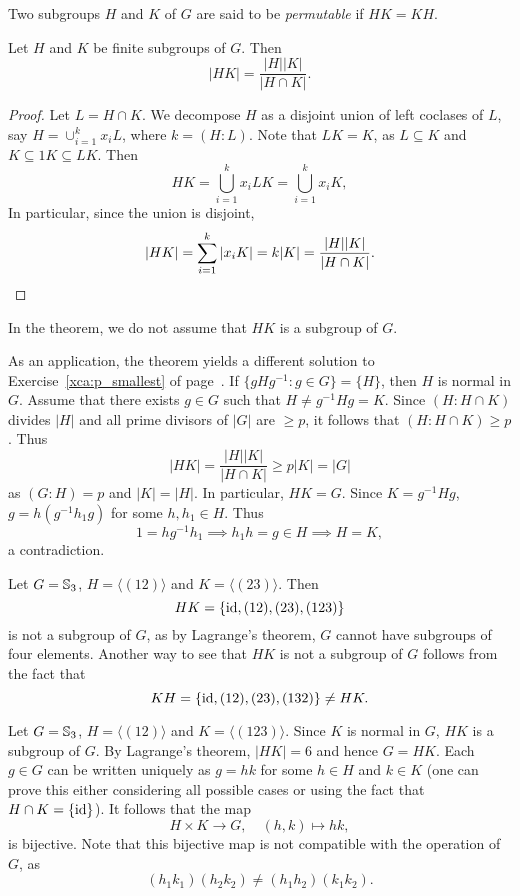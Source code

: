 Two subgroups $H$ and $K$ of $G$ are said to be
\emph{permutable} if $HK=KH$.

\begin{theorem}
\label{thm:|HK|}
    Let $H$ and $K$ be finite subgroups of $G$. 
    Then 
    \[
        |HK|=\frac{|H||K|}{|H\cap K|}.
    \]
\end{theorem}

\begin{proof}
Let $L=H\cap K$.
We decompose $H$ as a disjoint union of left coclases of $L$, say 
$H=\cup_{i=1}^k x_iL$, where $k=(H:L)$. Note that $LK=K$, as $L\subseteq K$ and $K\subseteq 1K\subseteq LK$.
Then
\[
HK=\bigcup_{i=1}^k x_iLK=\bigcup_{i=1}^k x_iK,
\]
In particular, since the union is disjoint, 
\[
|HK|=\sum_{i=1}^k |x_iK|=k|K|=\frac{|H||K|}{|H\cap K|}.\qedhere
\]
\end{proof}

In the theorem, we do not assume that $HK$ is a subgroup of $G$. 

As an application, the theorem yields a different solution to Exercise~\ref{xca:p_smallest} of page~\pageref{xca:p_smallest}. 
If $\{gHg^{-1}:g\in G\}=\{H\}$, then $H$ is normal in $G$. Assume that
there exists $g\in G$ such that
$H\ne g^{-1}Hg=K$. Since $(H:H\cap K)$ divides $|H|$ 
and all prime divisors of $|G|$ 
are $\geq p$, it follows that $(H:H\cap K)\geq p$. Thus 
\[
|HK|=\frac{|H||K|}{|H\cap K|}\geq p|K|=|G|
\]
as $(G:H)=p$ and $|K|=|H|$. In particular, $HK=G$. Since $K=g^{-1}Hg$, 
$g=h(g^{-1}h_1g)$ for some $h,h_1\in H$. Thus 
\[
1=hg^{-1}h_1\implies h_1h=g\in H\implies H=K,
\]
a contradiction.

\begin{example}
Let $G=\mathbb{S}_3$, $H=\langle (12)\rangle$ and $K=\langle (23)\rangle$. Then 
\[
HK=\{\operatorname{id},(12),(23),(123)\}
\]
is not a subgroup of $G$, as by Lagrange's theorem, 
$G$ cannot have subgroups of four elements. Another way 
to see that $HK$ is not a subgroup of $G$ follows from 
the fact that 
\[
KH=\{\operatorname{id},(12),(23),(132)\}\ne HK.
\]
\end{example}

\begin{example}
Let $G=\mathbb{S}_3$, $H=\langle (12)\rangle$ and $K=\langle (123)\rangle$.
Since $K$ is normal in $G$, $HK$ is a subgroup of $G$. By Lagrange's theorem, $|HK|=6$ and hence $G=HK$.
Each $g\in G$ can be written uniquely as $g=hk$ for some $h\in H$ and $k\in K$ (one can prove this either considering all possible cases or 
using the fact that $H\cap K=\{\operatorname{id}\}$). It follows that the map 
\[
H\times K\to G,\quad
(h,k)\mapsto hk,
\]
is bijective. Note that this bijective map is not compatible 
with the operation of $G$, as 
\[
(h_1k_1)(h_2k_2)\ne (h_1h_2)(k_1k_2).
\]
\end{example}

